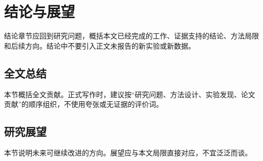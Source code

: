 \chapter{结论与展望}
\label{chap:conclusion}

结论章节应回到研究问题，概括本文已经完成的工作、证据支持的结论、方法局限和后续方向。结论中不要引入正文未报告的新实验或新数据。

\section{全文总结}
\label{sec:summary}

本节概括全文贡献。正式写作时，建议按“研究问题、方法设计、实验发现、论文贡献”的顺序组织，不使用夸张或无证据的评价词。

\section{研究展望}
\label{sec:future-work}

本节说明未来可继续改进的方向。展望应与本文局限直接对应，不宜泛泛而谈。

